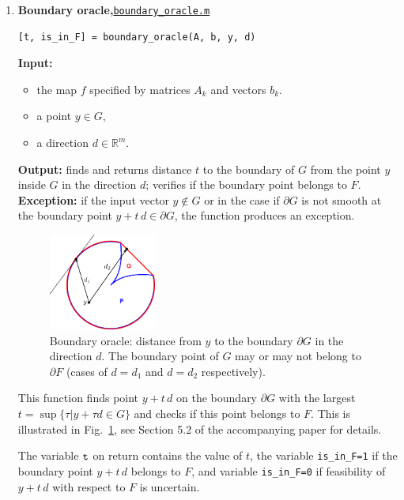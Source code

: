 \documentclass[a4paper]{article}
\newcommand{\R}{\mathbb{R}}
\theoremstyle{definition}
\begin{document}
\begin{enumerate}
The function returns {\tt is\_infeasible=1} if the desired hyperplane was found.
In this case $y\notin G$ and consequently $y\notin F$, implying there is no $x\in \mathbb{V}$ such that $y=f(x)$, i.e.~this point is infeasible.
If the hyperplane was not found the function returns {\tt is\_infeasible=0}, which means $y$ does belong to $G$ but the feasibility  of $y$ with respect to $F$ is uncertain.
\newpage
\item {\bf Boundary oracle,\hskip 6pt}\underline{\tt boundary\_oracle.m}
\begin{verbatim}
[t, is_in_F] = boundary_oracle(A, b, y, d)
\end{verbatim}
{\bf Input:}
\begin{itemize}
	\item the map $f$ specified by matrices $A_k$ and vectors $b_k$.
	\item a point $y\in G$,
	\item a direction $d\in\R^m$.
\end{itemize}
{\bf Output:}  finds and returns distance $t$ to the boundary of $G$ from the point $y$ inside $G$ in the direction $d$; verifies if the boundary point belongs to $F$.\\
{\bf Exception:}  if the input vector $y\notin G$ or in the case if $\partial G$ is not smooth at the boundary point $y+t\,d\in \partial G$, the function produces an exception.


\begin{figure}[H]
	\centering\includegraphics[width=100pt]{fig/boundary_oracle}
\captionsetup{width=.8\linewidth}
	\caption{Boundary oracle: distance from $y$ to the boundary $\partial G$ in the direction $d$.
	The boundary point of $G$ may or may not belong to $\partial F$ (cases of $d=d_1$ and $d=d_2$ respectively).}
\label{fig:two}
\end{figure}


This function finds point $y+t\,d$ on the boundary $\partial G$ with the largest $ {t} = \sup\{\tau\big| y+\tau d\in G\}$ and checks if this point belongs to $F$. 
This is illustrated in Fig.~\ref{fig:two}, see Section 5.2 of the accompanying paper for details.

The variable $\tt t$ on return contains the value of $t$, the variable {\tt  is\_in\_F=1} if the boundary point $y+t\,d$ belongs to $F$, and variable {\tt  is\_in\_F=0} if feasibility of $y+t\,d$ with respect to $F$ is uncertain.


\end{enumerate}
\end{document}
